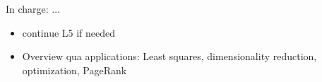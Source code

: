 \documentclass[11pt]{article}
\begin{document}




In charge: ...




\begin{itemize}
    \item continue L5 if needed
    \item Overview qua applications: Least squares, dimensionality reduction, optimization, PageRank
\end{itemize}
\end{document}
